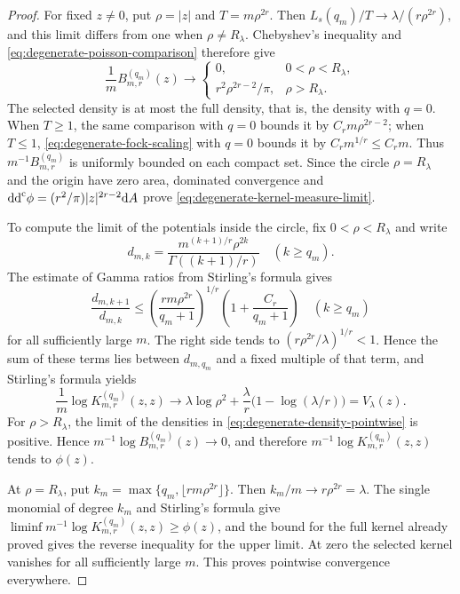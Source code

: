 \begin{proof}
For fixed $z\ne0$, put $\rho=|z|$ and $T=m\rho^{2r}$. Then $L_s(q_m)/T\to\lambda/(r\rho^{2r})$, and this limit differs from one when $\rho\neq R_\lambda$. Chebyshev's inequality and \eqref{eq:degenerate-poisson-comparison} therefore give
\begin{equation}\label{eq:degenerate-density-pointwise}
 \frac1m B_{m,r}^{(q_m)}(z)\longrightarrow
 \begin{cases}
 0,&0<\rho<R_\lambda,\\
 r^2\rho^{2r-2}/\pi,&\rho>R_\lambda.
 \end{cases}
\end{equation}
The selected density is at most the full density, that is, the density with $q=0$. When $T\geq1$, the same comparison with $q=0$ bounds it by $C_r m\rho^{2r-2}$; when $T\leq1$, \eqref{eq:degenerate-fock-scaling} with $q=0$ bounds it by $C_r m^{1/r}\leq C_r m$. Thus $m^{-1}B_{m,r}^{(q_m)}$ is uniformly bounded on each compact set. Since the circle $\rho=R_\lambda$ and the origin have zero area, dominated convergence and
$\mathrm{dd}^{\mathrm{c}}\phi=(r^2/\pi)|z|^{2r-2}\mathrm{d}A$
prove \eqref{eq:degenerate-kernel-measure-limit}.

To compute the limit of the potentials inside the circle, fix $0<\rho<R_\lambda$ and write
\[
 d_{m,k}=\frac{m^{(k+1)/r}\rho^{2k}}{\Gamma((k+1)/r)}
 \quad(k\geq q_m).
\]
The estimate of Gamma ratios from Stirling's formula gives
\[
 \frac{d_{m,k+1}}{d_{m,k}}
 \leq\left(\frac{rm\rho^{2r}}{q_m+1}\right)^{1/r}
           \left(1+\frac{C_r}{q_m+1}\right)
 \quad(k\geq q_m)
\]
for all sufficiently large $m$. The right side tends to $(r\rho^{2r}/\lambda)^{1/r}<1$. Hence the sum of these terms lies between $d_{m,q_m}$ and a fixed multiple of that term, and Stirling's formula yields
\[
 \frac1m\log K_{m,r}^{(q_m)}(z,z)
 \longrightarrow\lambda\log\rho^2+
                 \frac\lambda r\bigl(1-\log(\lambda/r)\bigr)
 =V_\lambda(z).
\]
For $\rho>R_\lambda$, the limit of the densities in \eqref{eq:degenerate-density-pointwise} is positive. Hence $m^{-1}\log B_{m,r}^{(q_m)}(z)\to0$, and therefore $m^{-1}\log K_{m,r}^{(q_m)}(z,z)$ tends to $\phi(z)$.

At $\rho=R_\lambda$, put $k_m=\max\{q_m,\lfloor rm\rho^{2r}\rfloor\}$. Then $k_m/m\to r\rho^{2r}=\lambda$. The single monomial of degree $k_m$ and Stirling's formula give
$\liminf m^{-1}\log K_{m,r}^{(q_m)}(z,z)\geq\phi(z)$,
and the bound for the full kernel already proved gives the reverse inequality for the upper limit. At zero the selected kernel vanishes for all sufficiently large $m$. This proves pointwise convergence everywhere.


\end{proof}
